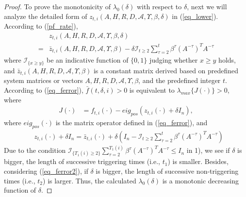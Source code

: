 \documentclass[journal,transmag]{IEEEtran}
\begin{document}
{\begin{proof}
To prove the monotonicity of $\lambda_0(\delta)$ with respect to $\delta$, next we will analyze the detailed form of $ z_{ t,i}(A,H,R,D,\mathcal{A},\Upsilon, \beta,\delta)$ in (\ref{eq_lower}). According to (\ref{pf_rate}), 
\begin{align*}
&z_{ t,i}(A,H,R,D,\mathcal{A},\Upsilon, \beta,\delta)\\
=&\bar z_{ t,i}(A,H,R,D,\mathcal{A},\Upsilon, \beta)-\delta\mathcal{I}_{t\geq 2}\sum_{\tau=2}^{t} \beta^{\tau}(A^{-\tau})^{T}A^{-\tau}
\end{align*}
where $\mathcal{I}_{ \{x\geq y\}}$ be an indicative function of $\{0,1\}$ judging whether $x\geq y$ holds, and $\bar z_{ t,i}(A,H,R,D,\mathcal{A},\Upsilon, \beta)$ is  a constant matrix derived based on predefined system matrices or vectors $A,H,R,D,\mathcal{A},\Upsilon, \beta$, and  the predefined integer $t$. According to (\ref{eq_ferror}), $\bar f(t,\delta,i)>0$ is equivalent to $\lambda_{max}\{J(\cdot)\}>0$, where
\begin{align*}
J(\cdot)&= f_{t,i}(\cdot)-eig_{pos}\left(z_{t,i}(\cdot)+\delta I_n\right),
\end{align*}
where $eig_{pos}(\cdot)$ is the matrix operator defined in (\ref{eq_ferror}), and 
\begin{align*}
&z_{t,i}(\cdot)+\delta I_n=\bar z_{t,i}(\cdot)+\delta\left(I_{n}-\mathcal{I}_{t\geq 2}\sum_{\tau=2}^{t} \beta^{\tau}(A^{-\tau})^{T}A^{-\tau}\right)
\end{align*}
Due to the condition  $\mathcal{I}_{\{T_1(i)\geq 2\}}\sum_{\tau=2}^{T_1(i)} \beta^{\tau}(A^{-\tau})^{T}A^{-\tau}\leq I_{n}$ in 1),
we see if $\delta$ is bigger, the length of successive triggering times (i.e., $t_1$) is smaller. Besides, considering (\ref{eq_ferror2}), if $\delta$ is bigger, the length of successive non-triggering times (i.e., $t_2$) is larger. Thus, the calculated $\lambda_0(\delta)$ is a monotonic decreasing function of $\delta.$
\end{proof}
	
}
\end{document}
